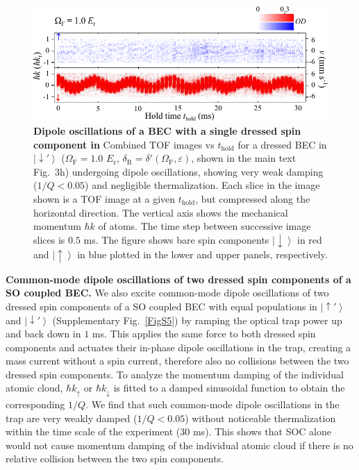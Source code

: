\documentclass[showpacs,preprintnumbers,amsmath,amssymb, superscriptaddress, aps, reprint]{revtex4-1}
\def\E_r{E_{\text{r}}}
\def\deltaR{\delta_{\text{R}}}
\def\OmegaF{\Omega_{\text{F}}}
\def\thold{t_{\text{hold}}}
\begin{document}
{{\vspace{5mm}
\begin{figure}[h]
\centering
\includegraphics[width=6.6in]{SI_Fig1_pol_Vfinal.pdf}
\caption{\textbf{Dipole oscillations of a BEC with a single dressed spin component in } Combined TOF images vs $\thold$ for a dressed BEC in $\left|{ \downarrow '}\right\rangle$ ($\OmegaF = 1.0$ $\E_r$, ${\deltaR} = \delta '({\OmegaF},\varepsilon )$, shown in the main text Fig.~3h) undergoing dipole oscillations, showing very weak damping ($1/Q < 0.05$) and negligible thermalization. Each slice in the image shown is a TOF image at a given $\thold$, but compressed along the horizontal direction. The vertical axis shows the mechanical momentum $\hbar k$ of atoms. The time step between successive image slices is $0.5$ ms. The figure shows bare spin components $\left|  \downarrow\right\rangle$ in red and $\left|  \uparrow\right\rangle$ in blue plotted in the lower and upper panels, respectively.}
\label{FigS4}
\end{figure}



\vspace{5mm}
\noindent
\textbf{Common-mode dipole oscillations of two dressed spin components of a SO coupled BEC.} We also excite common-mode dipole oscillations of two dressed spin components of a SO coupled BEC with equal populations in $\left| { \uparrow '} \right\rangle$ and $\left| { \downarrow '} \right\rangle$ (Supplementary Fig.~\ref{FigS5}) by ramping the optical trap power up and back down in $1$ ms. This applies the same force to both dressed spin components and actuates their in-phase dipole oscillations in the trap, creating a mass current without a spin current, therefore also no collisions between the two dressed spin components. To analyze the momentum damping of the individual atomic cloud, $\hbar {k_ \uparrow }$ or $\hbar {k_ \downarrow }$ is fitted to a damped sinusoidal function to obtain the corresponding $1/Q$. We find that such common-mode dipole oscillations in the trap are very weakly damped ($1/Q < 0.05$) without noticeable thermalization within the time scale of the experiment ($30$ ms). This shows that SOC alone would not cause momentum damping of the individual atomic cloud if there is no relative collision between the two spin components.

}}
\end{document}

